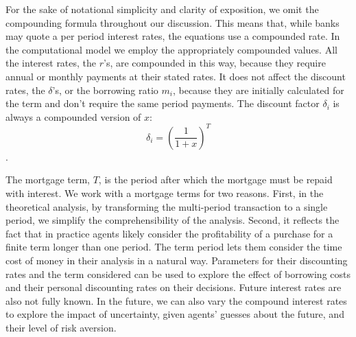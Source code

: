 For the sake of notational simplicity and clarity of exposition,  we omit the compounding formula throughout our discussion. This means that, while banks may quote a per period interest rates, the equations use a compounded rate. In the computational model we employ the appropriately compounded values. All %
 the interest rates, the $r$'s, are compounded in this way, because they require annual or monthly payments at their stated rates.
 It does not affect the discount rates, the $\delta$'s, or the borrowing ratio $m_i$, because they are initially calculated for the term and don't require the same period payments.
 The discount factor $\delta_i$ is always a compounded version of $x$:
 \[\delta_i=\left(\frac{1}{1+x}\right)^T\].

 The {mortgage term}, $T$, is the period after which the mortgage must be repaid with interest. We work with a mortgage terms for two reasons. First, in the theoretical analysis, by transforming the multi-period transaction to a single period, we simplify the comprehensibility of the analysis. Second, it reflects the fact that in practice agents  likely consider the profitability of a purchase for a finite term longer than one period. The term period lets them consider the time cost of money in their analysis in a natural way. Parameters for their discounting rates and the term considered can be used to explore the effect of borrowing costs and their personal discounting rates on their decisions. Future interest rates are also not fully known. In the future, we can also vary the compound interest rates to explore the impact of uncertainty, given agents' guesses about the future, and their level of risk aversion.

